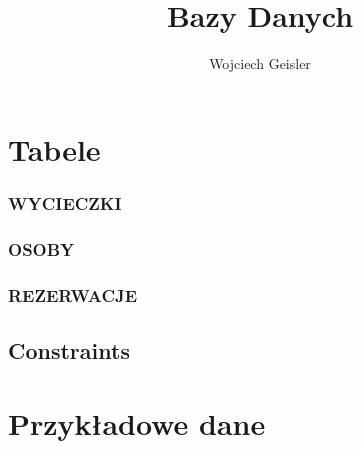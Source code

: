 \documentclass[12pt]{article}
\begin{document}
\title{Bazy Danych}
\author{Wojciech Geisler}
\date{}
\maketitle

\tableofcontents

\clearpage

\section{Tabele}

\subsubsection{WYCIECZKI}


\subsubsection{OSOBY}


\subsubsection{REZERWACJE}


\subsection{Constraints}


\section{Przykładowe dane}

\end{document}
